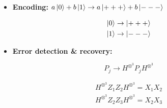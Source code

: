 \documentclass[10pt]{beamer}
\theoremstyle{remark}
\theoremstyle{definition}
\begin{document}
\begin{frame}[allowframebreaks]
    \framebreak
    
    \begin{itemize}
        \item \textbf{Encoding:} $a \ket{0} + b \ket{1} \rightarrow a \ket{+++} + b \ket{---}$
    \end{itemize}

    \begin{figure}
        \centering
        \begin{subfigure}{0.2\textwidth}
            \centering
            \begin{gather*}
                \ket{0} \rightarrow \ket{+++} \\
                \ket{1} \rightarrow \ket{---}
            \end{gather*}
        \end{subfigure}%
        \begin{subfigure}{0.5\textwidth}
            \centering
        \end{subfigure}
    \end{figure}


    \begin{itemize}
        \item \textbf{Error detection \& recovery:}
    \end{itemize}

    \begin{figure}
        \centering
        \begin{subfigure}{0.2\textwidth}
            \[
                P_j \rightarrow H^{\otimes^3} P_j H^{\otimes^3}
            \]
        \end{subfigure}%
        \begin{subfigure}{0.5\textwidth}
            \centering
            \begin{gather*}
                H^{\otimes^3} Z_1 Z_2 H^{\otimes^3} = X_1 X_2 \\
                H^{\otimes^3} Z_2 Z_3 H^{\otimes^3} = X_2 X_3
            \end{gather*}
        \end{subfigure}
    \end{figure}


\end{frame}
\end{document}
